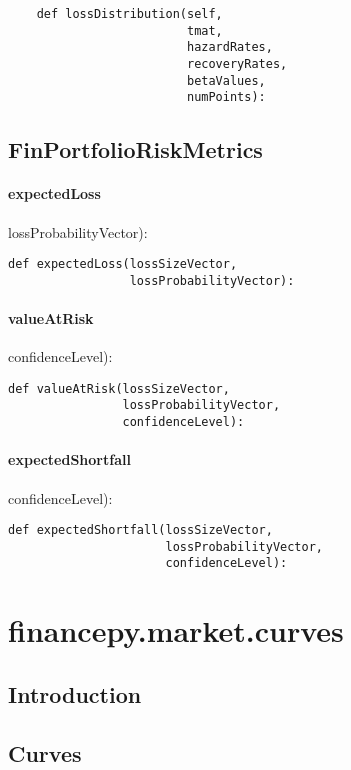 \documentclass[twoside,11pt]{book}
\begin{document}
\begin{lstlisting}
    def lossDistribution(self,
                         tmat,
                         hazardRates,
                         recoveryRates,
                         betaValues,
                         numPoints):
\end{lstlisting}

\newpage
\section{FinPortfolioRiskMetrics}

\subsubsection*{{\bf expectedLoss}}
lossProbabilityVector): 

\begin{lstlisting}
def expectedLoss(lossSizeVector,
                 lossProbabilityVector):
\end{lstlisting}

\subsubsection*{{\bf valueAtRisk}}
confidenceLevel): 

\begin{lstlisting}
def valueAtRisk(lossSizeVector,
                lossProbabilityVector,
                confidenceLevel):
\end{lstlisting}

\subsubsection*{{\bf expectedShortfall}}
confidenceLevel): 

\begin{lstlisting}
def expectedShortfall(lossSizeVector,
                      lossProbabilityVector,
                      confidenceLevel):
\end{lstlisting}


\chapter{financepy.market.curves}
\section{Introduction}


\section*{Curves}
\end{document}
